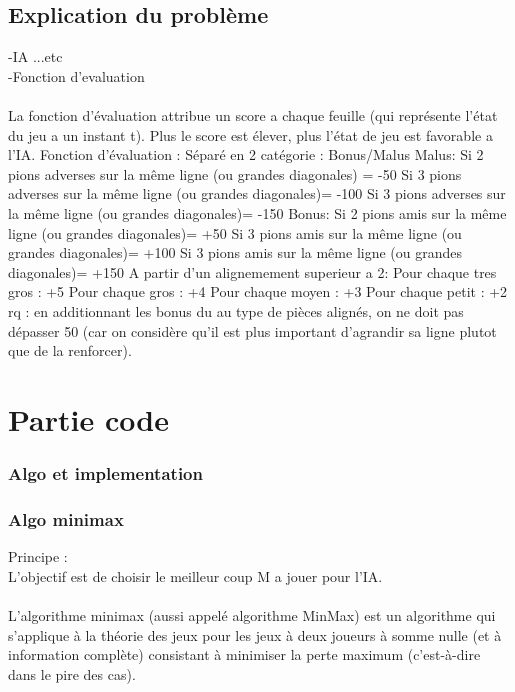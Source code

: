 \documentclass[a4]{article}
\begin{document}
		\subsection{Explication du problème}
				-IA ...etc\\
				-Fonction d'evaluation\\ \\
				La fonction d'évaluation attribue un score a chaque feuille (qui représente l'état du jeu a un instant t).
Plus le score est élever, plus l'état de jeu est favorable a l'IA.
Fonction d'évaluation :
	Séparé en 2 catégorie : Bonus/Malus
	Malus:
		Si 2 pions adverses sur la même ligne (ou grandes diagonales) = -50
		Si 3 pions adverses sur la même ligne (ou grandes diagonales)= -100
		Si 3 pions adverses sur la même ligne (ou grandes diagonales)= -150
	Bonus:
		Si 2 pions amis sur la même ligne (ou grandes diagonales)= +50
		Si 3 pions amis sur la même ligne (ou grandes diagonales)= +100
		Si 3 pions amis sur la même ligne (ou grandes diagonales)= +150
			A partir d'un alignemement superieur a 2:
					Pour chaque tres gros : +5
					Pour chaque gros : +4
					Pour chaque moyen : +3
					Pour chaque petit : +2
rq : en additionnant les bonus du au type de pièces alignés, on ne doit pas dépasser 50 (car on considère qu'il est 
plus important d'agrandir sa ligne plutot que de la renforcer).
	\section{Partie code}
					\subsubsection{Algo et implementation}
					
					\subsubsection{Algo minimax}
Principe :\\
L'objectif est de choisir le meilleur coup M a jouer pour l'IA.\\ \\

L'algorithme minimax (aussi appelé algorithme MinMax) est un algorithme qui s'applique
 à la théorie des jeux pour les jeux à deux joueurs à somme nulle (et à information complète)
  consistant à minimiser la perte maximum (c'est-à-dire dans le pire des cas). \\ \\
\end{document}
